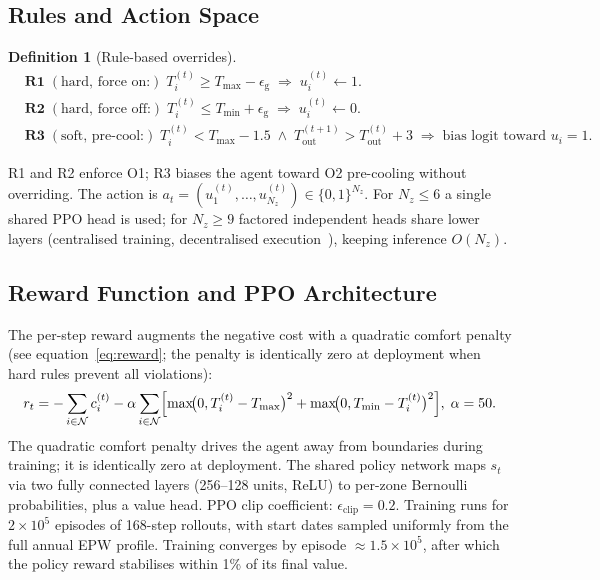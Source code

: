 \documentclass[3p,number]{elsarticle}
\let\oldsubsection\subsection
\renewcommand{\subsection}{\FloatBarrier\oldsubsection}
\newtheorem{definition}{Definition} \newtheorem{proposition}{Proposition} \newtheorem{remark}{Remark} \newtheorem{observation}{Observation}
\newcommand{\Tmin}{T_{\min}}
\newcommand{\Tmax}{T_{\max}}
\newcommand{\Tout}{T_{\mathrm{out}}}
\begin{document}
\subsection{Rules and Action Space}
\label{subsec:rules}
 
\begin{definition}[Rule-based overrides]
\label{def:rules}
\begin{align}
  &\textbf{R1}\;(\text{hard, force on:})\;
    T_i^{(t)}\ge\Tmax-\epsilon_{\mathrm{g}}
    \;\Rightarrow\;u_i^{(t)}\leftarrow1. \label{eq:R1}\\
  &\textbf{R2}\;(\text{hard, force off:})\;
    T_i^{(t)}\le\Tmin+\epsilon_{\mathrm{g}}
    \;\Rightarrow\;u_i^{(t)}\leftarrow0. \label{eq:R2}\\
  &\textbf{R3}\;(\text{soft, pre-cool:})\;
    T_i^{(t)}<\Tmax{-}1.5\;\wedge\;\Tout^{(t+1)}>\Tout^{(t)}{+}3
    \;\Rightarrow\;\text{bias logit toward }u_i{=}1. \label{eq:R3}
\end{align}
\end{definition}
 
R1 and R2 enforce O1; R3 biases the agent toward O2 pre-cooling without overriding.
The action is $a_t=(u_1^{(t)},\ldots,u_{N_z}^{(t)})\in\{0,1\}^{N_z}$.
For $N_z\le6$ a single shared PPO head is used; for $N_z\ge9$ factored independent heads share lower layers (centralised training, decentralised execution~\cite{Yu2021}), keeping inference $O(N_z)$.
 
\subsection{Reward Function and PPO Architecture}
\label{subsec:reward}
 
The per-step reward augments the negative cost with a quadratic comfort penalty (see equation~\eqref{eq:reward}; the penalty is identically zero at deployment when hard rules prevent all violations):
\begin{equation}
  r_t=-\sum_{i\in\mathcal{N}}c_i^{(t)}
  -\alpha\sum_{i\in\mathcal{N}}
  \Bigl[\max\!\bigl(0,T_i^{(t)}-\Tmax\bigr)^2
       +\max\!\bigl(0,\Tmin-T_i^{(t)}\bigr)^2\Bigr],
  \;\alpha=50.
  \label{eq:reward}
\end{equation}
The quadratic comfort penalty drives the agent away from boundaries during training; it is identically zero at deployment.
The shared policy network maps $s_t$ via two fully connected layers (256--128 units, ReLU) to per-zone Bernoulli probabilities, plus a value head.
PPO clip coefficient: $\epsilon_{\mathrm{clip}}=0.2$.
Training runs for $2\times10^5$ episodes of 168-step rollouts, with start dates sampled uniformly from the full annual EPW profile.
Training converges by episode $\approx1.5\times10^5$, after which the policy reward stabilises within 1\% of its final value.
 
\end{document}
